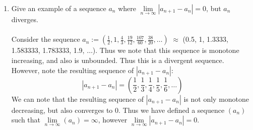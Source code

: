 \documentclass[12pt,letterpaper]{article}
\theoremstyle{case}
\theoremstyle{definition}
\newtheorem*{theorem*}{Theorem}
\begin{document}
\begin{enumerate}
\begin{enumerate}
\begin{proof}
\begin{theorem*}
\begin{enumerate}
						\item If $X=(x_n)$ converges to $x$ and $Z=(z_n)$ is a sequence of nonzero real numbers that converges to $z$ and if $z \neq 0$, then the quotient sequence $X/Z$ converges to $x/z$.
					\end{enumerate}
				\end{theorem*}
			Thus, by \textit{Theorem 3.2.3}, we have
			\[\lim\limits_{n \to \infty} (a_{n+1}-a_n)=B-A\]
			However, since we have that $\lim\limits_{n \to \infty} (a_n)=x$ and by \textit{Theorem 3.4.2}, since $(a_{n+1})$ is a subsequence of $(a_n)$, we know that 
			\[\lim\limits_{n \to \infty} (a_{n+1}) = \lim\limits_{n \to \infty} (a_n) = x\]
			Which yields that $A=x=B$. So, we have
			\[\lim\limits_{n \to \infty} (a_{n+1}-a_n)=B-A=A-A=B-B=x-x=0\]
			Hence,
			\[\lim\limits_{n \to \infty} |a_{n+1}-a_n|=|0|=0\]
			$\therefore$ if $(a_n)$ converges, then $\lim\limits_{n \to \infty} |a_{n+1}-a_n| = 0$.
			\end{proof}
			
			\item Give an example of a sequence $a_n$ where $\lim\limits_{n \to \infty}|a_{n+1}-a_n|=0$, but $a_n$ diverges.
			\\\\Consider the sequence $a_n:=(\frac{1}{2}, 1, \frac{4}{3}, \frac{19}{12}, \frac{107}{60}, \frac{38}{20}, \dots)$ $\approx$ (0.5, 1, 1.3333, 1.583333, 1.783333, 1.9, $\dots$). Thus we note that this sequence is monotone increasing, and also is unbounded. Thus this is a divergent sequence. However, note the resulting sequence of $|a_{n+1}-a_n|$:
			\[|a_{n+1}-a_n| = (\frac{1}{2}, \frac{1}{3}, \frac{1}{4}, \frac{1}{5}, \frac{1}{6}, \dots)\]
			We can note that the resulting sequence of $|a_{n+1}-a_n|$ is not only monotone decreasing, but also converges to 0. Thus we have defined a sequence $(a_n)$ such that $\lim\limits_{n \to \infty} (a_n) = \infty$, however $\lim\limits_{n \to \infty} |a_{n+1}-a_n| = 0$.\\
			

\end{enumerate}
\end{enumerate}
\end{document}

